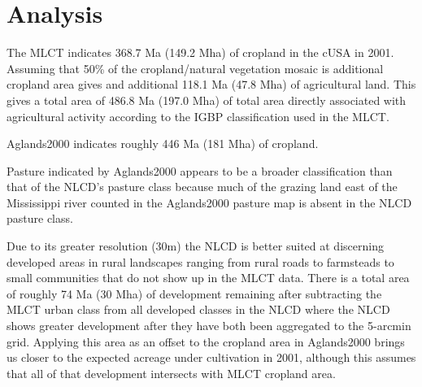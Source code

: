 
\chapter{Analysis}
\label{cha:analysis}

The MLCT indicates 368.7 Ma (149.2 Mha) of cropland in the cUSA in 2001.  Assuming that 50\% of the cropland/natural vegetation mosaic is additional cropland area gives and additional 118.1 Ma (47.8 Mha) of agricultural land.  This gives a total area of  486.8 Ma (197.0 Mha) of total area directly associated with agricultural activity according to the IGBP classification used in the MLCT.

Aglands2000 indicates roughly 446 Ma (181 Mha) of cropland.

Pasture indicated by Aglands2000 appears to be a broader classification than that of the NLCD's pasture class because much of the grazing land east of the Mississippi river counted in the Aglands2000 pasture map is absent in the NLCD pasture class.

Due to its greater resolution (30m) the NLCD is better suited at discerning developed areas in rural landscapes ranging from rural roads to farmsteads to small communities that do not show up in the MLCT data.  There is a total area of roughly 74 Ma (30 Mha) of development remaining after subtracting the MLCT urban class from all developed classes in the NLCD where the NLCD shows greater development after they have both been aggregated to the 5-arcmin grid.  Applying this area as an offset to the cropland area in Aglands2000 brings us closer to the expected acreage under cultivation in 2001, although this assumes that all of that development intersects with MLCT cropland area.

